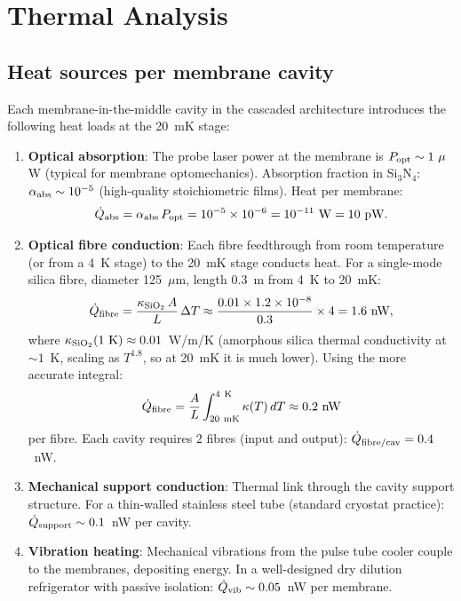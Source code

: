 \documentclass[11pt]{article}
\newcommand{\ee}[1]{\times 10^{#1}}
\theoremstyle{definition}
\theoremstyle{remark}
\begin{document}
\section{Thermal Analysis}
\label{sec:cryo}

\subsection{Heat sources per membrane cavity}

Each membrane-in-the-middle cavity in the cascaded architecture
introduces the following heat loads at the 20~mK stage:

\begin{enumerate}[nosep]
\item \textbf{Optical absorption}: The probe laser power at the
  membrane is $P_{\rm opt} \sim 1~\mu$W (typical for membrane
  optomechanics). Absorption fraction in Si$_3$N$_4$:
  $\alpha_{\rm abs} \sim 10^{-5}$ (high-quality stoichiometric
  films). Heat per membrane:
  \begin{equation}
  \dot{Q}_{\rm abs} = \alpha_{\rm abs}\,P_{\rm opt}
  = 10^{-5}\times 10^{-6} = 10^{-11}~\text{W} = 10~\text{pW}.
  \end{equation}

\item \textbf{Optical fibre conduction}: Each fibre feedthrough
  from room temperature (or from a 4~K stage) to the 20~mK stage
  conducts heat. For a single-mode silica fibre, diameter 125~$\mu$m,
  length 0.3~m from 4~K to 20~mK:
  \begin{equation}
  \dot{Q}_{\rm fibre} = \frac{\kappa_{\rm SiO_2}\,A}{L}\,\Delta T
  \approx \frac{0.01\times 1.2\ee{-8}}{0.3}\times 4
  = 1.6~\text{nW},
  \label{eq:fibre_heat}
  \end{equation}
  where $\kappa_{\rm SiO_2}(1~\text{K}) \approx 0.01$~W/m/K
  (amorphous silica thermal conductivity at $\sim 1$~K, scaling
  as $T^{1.8}$, so at 20~mK it is much lower). Using the more
  accurate integral:
  \begin{equation}
  \dot{Q}_{\rm fibre} = \frac{A}{L}\int_{20~\text{mK}}^{4~\text{K}}
  \kappa(T)\,dT \approx 0.2~\text{nW}
  \end{equation}
  per fibre. Each cavity requires 2 fibres (input and output):
  $\dot{Q}_{\rm fibre/cav} = 0.4$~nW.

\item \textbf{Mechanical support conduction}: Thermal link through
  the cavity support structure. For a thin-walled stainless steel
  tube (standard cryostat practice): $\dot{Q}_{\rm support}
  \sim 0.1$~nW per cavity.

\item \textbf{Vibration heating}: Mechanical vibrations from the
  pulse tube cooler couple to the membranes, depositing energy.
  In a well-designed dry dilution refrigerator with passive
  isolation: $\dot{Q}_{\rm vib} \sim 0.05$~nW per membrane.
\end{enumerate}
\end{document}
